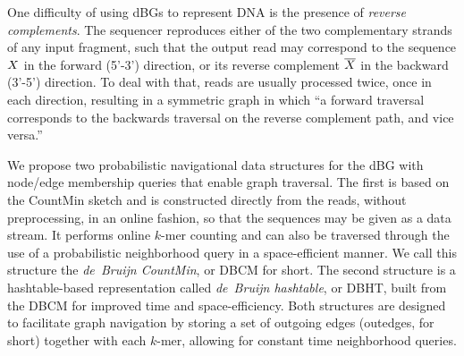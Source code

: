 \documentclass[a4paper,12pt]{article}
\newcommand{\dB}{de~Bruijn\xspace}
\newcommand{\dBCM}{DBCM\xspace}
\newcommand{\dBHT}{DBHT\xspace}
\newcommand{\cm}{CountMin\xspace}
\newcommand{\kmer}{\mbox{$k$-mer}\xspace}
\newcommand{\chr}[1]{\ensuremath{\mathtt{#1}}}
\newcommand{\A}{\chr{A}}
\newcommand{\C}{\chr{C}}
\newcommand{\G}{\chr{G}}
\newcommand{\T}{\chr{T}}
\newcommand{\keyterm}[1]{\textit{#1}\/\xspace}
\newcommand{\strname}[1]{\ensuremath{\uppercase{#1}}}
\newcommand{\strsetname}[1]{\ensuremath{\mathcal{\uppercase{#1}}}}
\begin{document}
One difficulty of using dBGs to represent DNA is the presence of \keyterm{reverse complements}. The sequencer reproduces either of the two complementary strands of any input fragment, such that the output read may correspond to the sequence \strname{X} in the forward (5'-3') direction, or its reverse complement \strname{\overline{X}} in the backward (3'-5') direction.
To deal with that, reads are usually processed twice, once in each direction,
resulting in a symmetric graph in which ``a forward traversal corresponds to the backwards traversal on the reverse complement path, and vice versa.'' \cite{Conway2011}

We propose two probabilistic navigational data structures \cite{Chikhi2014} for the dBG with node/edge membership queries that enable graph traversal. The first is based on the \cm sketch \cite{Cormode2005} and is constructed directly from the reads, without preprocessing, in an online fashion, so that the sequences may be given as a data stream. It performs online \kmer counting and can also be traversed through the use of a probabilistic neighborhood query in a space-efficient manner. We call this structure the \keyterm{\dB \cm}, or \dBCM for short. The second structure is a hashtable-based representation called \keyterm{\dB hashtable}, or \dBHT, built from the \dBCM for improved time and space-efficiency. Both structures are designed to facilitate graph navigation by storing a set of outgoing edges (outedges, for short) together with each \kmer, allowing for constant time neighborhood queries. 

\end{document}
